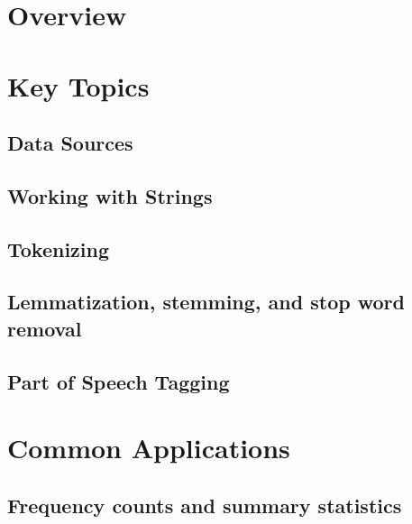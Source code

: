 \documentclass[
]{book}
\begin{document}
\hypertarget{overview-1}{%
\section{Overview}\label{overview-1}}

\hypertarget{key-topics-1}{%
\section{Key Topics}\label{key-topics-1}}

\hypertarget{data-sources}{%
\subsection{Data Sources}\label{data-sources}}

\hypertarget{working-with-strings}{%
\subsection{Working with Strings}\label{working-with-strings}}

\hypertarget{tokenizing}{%
\subsection{Tokenizing}\label{tokenizing}}

\hypertarget{lemmatization-stemming-and-stop-word-removal}{%
\subsection{Lemmatization, stemming, and stop word removal}\label{lemmatization-stemming-and-stop-word-removal}}

\hypertarget{part-of-speech-tagging}{%
\subsection{Part of Speech Tagging}\label{part-of-speech-tagging}}

\hypertarget{common-applications-1}{%
\section{Common Applications}\label{common-applications-1}}

\hypertarget{frequency-counts-and-summary-statistics}{%
\subsection{Frequency counts and summary statistics}\label{frequency-counts-and-summary-statistics}}
\end{document}
